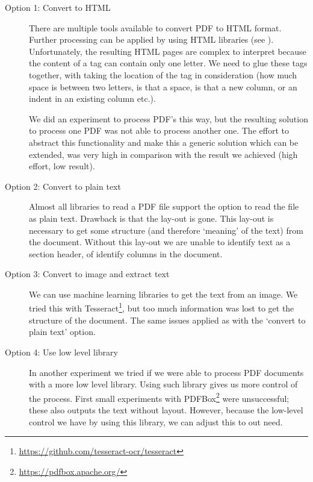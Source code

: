 \documentclass{ou-report}
\begin{document}
\begin{description}
    \item[Option 1: Convert to HTML] There are multiple tools available to 
        convert PDF to HTML format. Further processing can be applied by using
        HTML libraries (see ). Unfortunately, the
        resulting HTML pages are complex to interpret because the content of a 
        tag can contain only one letter. We need to glue these tags together,
        with taking the location of the tag in consideration (how much space is
        between two letters, is that a space, is that a new column, or an indent
        in an existing column etc.). 
        
        We did an 
        experiment to process PDF's this way, but the resulting solution to 
        process one PDF was not able to process another one. The effort to 
        abstract this functionality and make this a generic solution which 
        can be extended, was very high 
        in comparison with the result we achieved (high effort, low result).

    \item[Option 2: Convert to plain text] Almost all libraries to read a PDF 
        file support the option to read the file as plain text. Drawback is that
        the lay-out is gone. This lay-out is necessary to get some structure
        (and therefore `meaning' of the text) from the document. Without this
        lay-out we are unable to identify text as a section header, of identify
        columns in the document.
    
    \item[Option 3: Convert to image and extract text] We can use machine 
        learning libraries to get the text from an image. We tried this 
        with Tesseract\footnote{\url{https://github.com/tesseract-ocr/tesseract}
        }, but too much information was lost to get the structure of the
        document. The same issues applied as with the `convert to plain text'
        option.

    \item[Option 4: Use low level library] In another experiment we tried if 
        we were able to process PDF documents with a more low level library. 
        Using such library gives us more
        control of the process. First small experiments with
        PDFBox\footnote{\url{https://pdfbox.apache.org/}} were 
        unsuccessful; these also outputs the text without layout. However, 
        because the low-level control we have by using this library, we can 
        adjust this to out need.
\end{description}
\end{document}
